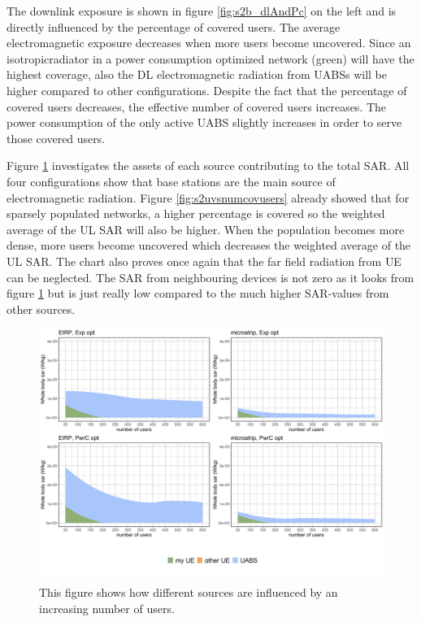 The downlink exposure is shown in figure \ref{fig:s2b_dlAndPc} on the left and is directly influenced by the percentage of covered users. 
The average electromagnetic exposure decreases when more users become uncovered. Since an \gls{isotropicradiator} in a power consumption optimized network (green)
will have the highest coverage, also the \gls{DL} electromagnetic radiation from \gls{UABS}s will be higher compared to other configurations.
Despite the fact that the percentage of covered users decreases, the effective number of covered users increases. The power consumption of the only 
active \gls{UABS} slightly increases in order to serve those covered users.


Figure \ref{fig:s2fourSourcesMatrix} investigates the assets of each source contributing to the total \gls{SAR}. All four 
configurations show that base stations are the main source of electromagnetic radiation.
Figure \ref{fig:s2uvsnumcovusers} already 
showed that for sparsely populated networks, a higher percentage is covered so the weighted average of the \gls{UL} \gls{SAR} will also be higher. 
When the population becomes more dense,
more users become uncovered which decreases the weighted average of the \gls{UL} \gls{SAR}.
The chart also proves once again that the far field radiation from \gls{UE} can be neglected. The \gls{SAR} from 
neighbouring devices is not zero as it looks from figure \ref{fig:s2fourSourcesMatrix} but is just really low compared to the much higher
\gls{SAR}-values from other sources.

\begin{figure}[h!]
\centering
  \includegraphics[width=\textwidth/6*5]{../results/s2/uFourSources.png}
  \caption{This figure shows how different sources are influenced by an increasing number of users. }
  \label{fig:s2fourSourcesMatrix}
\end{figure}

